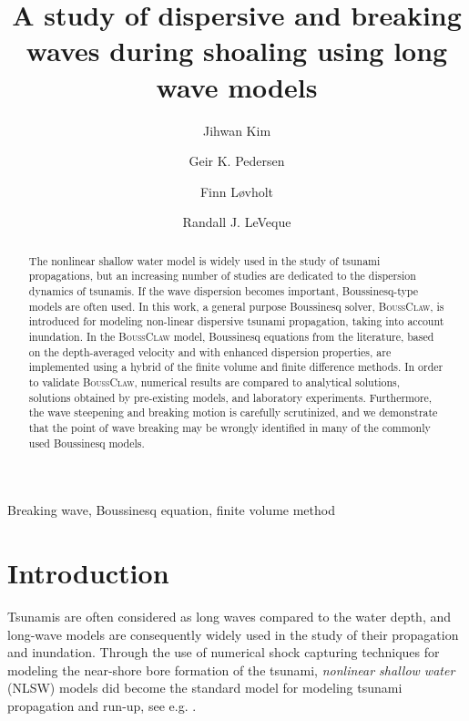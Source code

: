 \documentclass[review]{elsarticle}
\newcommand{\BoussClaw}{\textsc{BoussClaw} }
\newcommand{\BoussClawt}{\textsc{BoussClaw}}
\begin{document}
\begin{frontmatter}

\title{A study of dispersive and breaking waves during shoaling using long wave models}

\author[1]{Jihwan Kim}
\author[1]{Geir K. Pedersen}
\author[1,2]{Finn L{\o}vholt}
\author[3]{Randall J. LeVeque}

\address[1]{University of Oslo, Department of Mathematics, 
Oslo, Norway}
\address[2]{Norwegian Geotechnical Institute,
Oslo, Norway}
\address[3]{University of Washington, Department of Applied Mathematics, Seattle, USA}

\begin{abstract}

The nonlinear shallow water model is widely used
in the study of tsunami propagations,
but an increasing number of studies 
are dedicated to the dispersion dynamics of tsunamis.
If the wave dispersion becomes important,
Boussinesq-type models are often used. 
In this work, a general purpose Boussinesq solver, 
\BoussClawt, is introduced
for modeling non-linear dispersive tsunami propagation, 
taking into account inundation. 
In the \BoussClaw model,
Boussinesq equations from the literature, 
based on the depth-averaged velocity 
and with enhanced dispersion properties, 
are implemented using a hybrid of the finite volume
and finite difference methods.
In order to validate \BoussClawt, 
numerical results are compared 
to  analytical solutions, solutions obtained by pre-existing models, and laboratory experiments. 
Furthermore, the  wave steepening and breaking motion
is carefully scrutinized, 
and we demonstrate that the point of wave breaking
may be wrongly identified  in many of the commonly used Boussinesq models. 

\end{abstract}

\begin{keyword}
Breaking wave, Boussinesq equation, finite volume method
\end{keyword}

\end{frontmatter}

\linenumbers

\section{Introduction}

Tsunamis are often considered as long waves compared to the water depth, and 
long-wave models are consequently widely used in the study of their propagation and inundation.
Through the use of numerical shock capturing techniques for modeling
the near-shore bore formation of the tsunami, {\em nonlinear shallow water} (NLSW) models
did become the standard model for modeling tsunami propagation and run-up, see e.g. 
\citep{titov1995modeling,Imamura1996b,Harig2008,BergerGeorgeLeVequeMandli11}.
\end{document}
